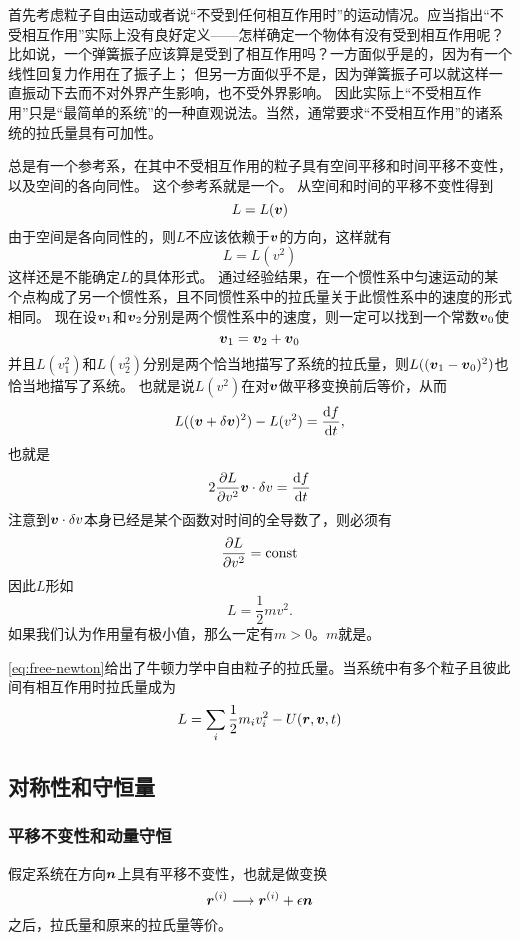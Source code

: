 首先考虑粒子自由运动或者说“不受到任何相互作用时”的运动情况。应当指出“不受相互作用”实际上没有良好定义——怎样确定一个物体有没有受到相互作用呢？
比如说，一个弹簧振子应该算是受到了相互作用吗？一方面似乎是的，因为有一个线性回复力作用在了振子上；
但另一方面似乎不是，因为弹簧振子可以就这样一直振动下去而不对外界产生影响，也不受外界影响。
因此实际上“不受相互作用”只是“最简单的系统”的一种直观说法。当然，通常要求“不受相互作用”的诸系统的拉氏量具有可加性。

总是有一个参考系，在其中不受相互作用的粒子具有空间平移和时间平移不变性，以及空间的各向同性。
这个参考系就是一个。
从空间和时间的平移不变性得到
\[
    L = L(\vb*{v})
\]
由于空间是各向同性的，则$L$不应该依赖于$\vb*{v}$的方向，这样就有
\[
    L = L(v^2)
\]
这样还是不能确定$L$的具体形式。
通过经验结果，在一个惯性系中匀速运动的某个点构成了另一个惯性系，且不同惯性系中的拉氏量关于此惯性系中的速度的形式相同。
现在设$\vb*{v}_1$和$\vb*{v}_2$分别是两个惯性系中的速度，则一定可以找到一个常数$\vb*{v}_0$使
\[
    \vb*{v}_1 = \vb*{v}_2 + \vb*{v}_0
\]
并且$L(v_1^2)$和$L(v_2^2)$分别是两个恰当地描写了系统的拉氏量，则$L((\vb*{v}_1 - \vb*{v}_0)^2)$也恰当地描写了系统。
也就是说$L(v^2)$在对$\vb*{v}$做平移变换前后等价，从而
\[
    L((\vb*{v} + \delta \vb*{v})^2) - L(v^2) = \dv{f}{t},
\]
也就是
\[
    2 \pdv{L}{v^2} \vb*{v} \cdot \delta v = \dv{f}{t}
\]
注意到$\vb*{v} \cdot \delta v$本身已经是某个函数对时间的全导数了，则必须有
\[
    \pdv{L}{v^2} = \mathrm{const}
\]
因此$L$形如
\begin{equation}
    L = \frac{1}{2} m v^2.
    \label{eq:free-newton}
\end{equation}
如果我们认为作用量有极小值，那么一定有$m>0$。$m$就是。

\eqref{eq:free-newton}给出了牛顿力学中自由粒子的拉氏量。当系统中有多个粒子且彼此间有相互作用时拉氏量成为
\begin{equation}
    L = \sum_i \frac{1}{2} m_i v_i^2 - U(\vb*{r}, \vb*{v}, t)
    \label{eq:interaction}
\end{equation}

\subsection{对称性和守恒量}

\subsubsection{平移不变性和动量守恒}

假定系统在方向$\vb*{n}$上具有平移不变性，也就是做变换
\[
    \vb*{r}^{(i)} \longrightarrow \vb*{r}^{(i)} + \epsilon \vb*{n}
\]
之后，拉氏量和原来的拉氏量等价。

